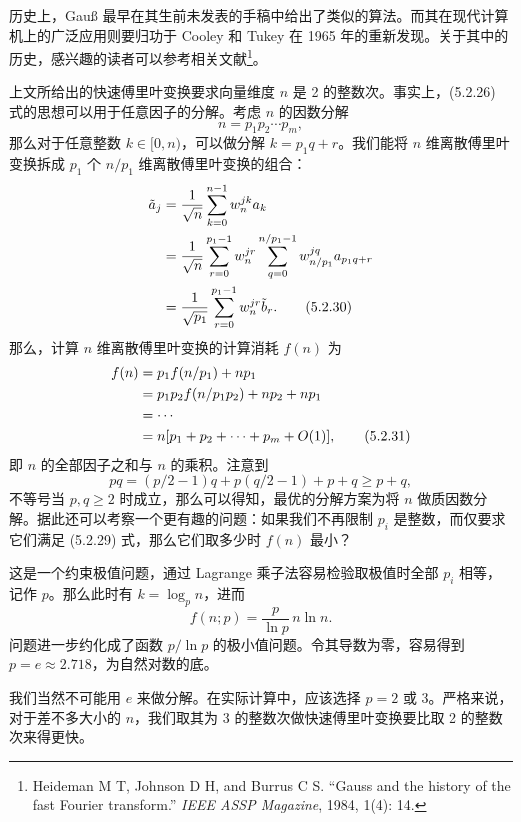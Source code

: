 历史上，Gauß 最早在其生前未发表的手稿中给出了类似的算法。而其在现代计算机上的广泛应用则要归功于 Cooley 和 Tukey 在 1965 年的重新发现。关于其中的历史，感兴趣的读者可以参考相关文献\footnote{Heideman M T, Johnson D H, and Burrus C S. ``Gauss and the history of the fast Fourier transform.'' \textit{IEEE ASSP Magazine}, 1984, 1(4): 14.}。

上文所给出的快速傅里叶变换要求向量维度 $n$ 是 2 的整数次。事实上，(5.2.26) 式的思想可以用于任意因子的分解。考虑 $n$ 的因数分解
\begin{equation}
n=p_1p_2\cdots p_m,
\tag{5.2.29}
\end{equation}
那么对于任意整数 $k\in[0,n)$，可以做分解 $k=p_1q+r$。我们能将 $n$ 维离散傅里叶变换拆成 $p_1$ 个 $n/p_1$ 维离散傅里叶变换的组合：
\begin{align}
\tilde a_j
&=\frac1{\sqrt n}\sum_{k=0}^{n-1}w_n^{jk}a_k\notag\\
&=\frac1{\sqrt n}\sum_{r=0}^{p_1-1}w_n^{jr}
\sum_{q=0}^{n/p_1-1}w_{n/p_1}^{jq}a_{p_1q+r}\notag\\
&=\frac1{\sqrt{p_1}}\sum_{r=0}^{p_1-1}w_n^{jr}\tilde b_r.
\tag{5.2.30}
\end{align}
那么，计算 $n$ 维离散傅里叶变换的计算消耗 $f(n)$ 为
\begin{align}
f(n)
&=p_1f(n/p_1)+np_1\notag\\
&=p_1p_2f(n/p_1p_2)+np_2+np_1\notag\\
&=\cdots\notag\\
&=n[p_1+p_2+\cdots+p_m+O(1)],
\tag{5.2.31}
\end{align}
即 $n$ 的全部因子之和与 $n$ 的乘积。注意到
\begin{equation}
pq=(p/2-1)q+p(q/2-1)+p+q\ge p+q,
\tag{5.2.32}
\end{equation}
不等号当 $p,q\ge2$ 时成立，那么可以得知，最优的分解方案为将 $n$ 做质因数分解。据此还可以考察一个更有趣的问题：如果我们不再限制 $p_i$ 是整数，而仅要求它们满足 (5.2.29) 式，那么它们取多少时 $f(n)$ 最小？

这是一个约束极值问题，通过 Lagrange 乘子法容易检验取极值时全部 $p_i$ 相等，记作 $p$。那么此时有 $k=\log_p n$，进而
\begin{equation}
f(n;p)=\frac{p}{\ln p}\,n\ln n.
\tag{5.2.33}
\end{equation}
问题进一步约化成了函数 $p/\ln p$ 的极小值问题。令其导数为零，容易得到 $p=e\approx2.718$，为自然对数的底。

我们当然不可能用 $e$ 来做分解。在实际计算中，应该选择 $p=2$ 或 $3$。严格来说，对于差不多大小的 $n$，我们取其为 3 的整数次做快速傅里叶变换要比取 2 的整数次来得更快。

